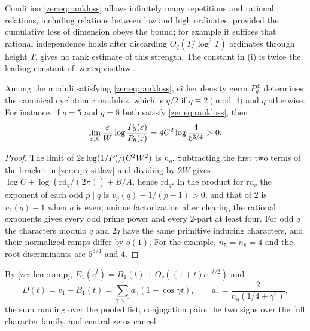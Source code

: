 Condition \eqref{zer:eq:rankloss} allows infinitely many repetitions and rational relations,
including relations between low and high ordinates, provided the cumulative loss of dimension obeys
the bound; for example it suffices that rational independence holds after discarding
$O_q(T/\log^2T)$ ordinates through height $T$.  gives no rank estimate of this
strength. The constant in (i) is twice the leading constant of \eqref{zer:eq:visitlaw}.

\begin{corollary}\label{zer:cor:visitmodulus}
Among the moduli satisfying \eqref{zer:eq:rankloss}, either density germ $P_q^\pm$ determines the
canonical cyclotomic modulus, which is $q/2$ if $q\equiv2\pmod4$ and $q$ otherwise. For instance, if
$q=5$ and $q=8$ both satisfy \eqref{zer:eq:rankloss}, then
\[
 \lim_{\varepsilon\downarrow0}\frac{\varepsilon} W\log\frac{P_5(\varepsilon)}{P_8(\varepsilon)}=4C^2\log\frac4{5^{3/4}}>0 .
\]
\end{corollary}
\begin{proof}
The limit of $2\varepsilon\log(1/P)/(C^2W^2)$ is $n_q$. Subtracting the first two terms of the bracket in
\eqref{zer:eq:visitlaw} and dividing by $2W$ gives $\log C+\log(\mathrm{rd}_q/(2\pi))+B/A$, hence
$\mathrm{rd}_q$. In the product for $\mathrm{rd}_q$ the exponent of each odd $p\mid q$ is
$v_p(q)-1/(p-1)>0$, and that of $2$ is $v_2(q)-1$ when $q$ is even; unique factorization after
clearing the rational exponents gives every odd prime power and every $2$-part at least four. For
odd $q$ the characters modulo $q$ and $2q$ have the same primitive inducing characters, and their
normalized ramps differ by $o(1)$. For the example, $n_5=n_8=4$ and the root discriminants are
$5^{3/4}$ and $4$.
\end{proof}

By \cref{zer:lem:ramp}, $E_1(e^t)=B_1(t)+O_q((1+t)e^{-t/2})$ and
\[
 D(t)=v_1-B_1(t)=\sum_{\gamma>0}a_\gamma(1-\cos\gamma t),\qquad a_\gamma=\frac2{n_q(1/4+\gamma^2)},
\]
the sum running over the pooled list; conjugation pairs the two signs over the full character
family, and central zeros cancel.

